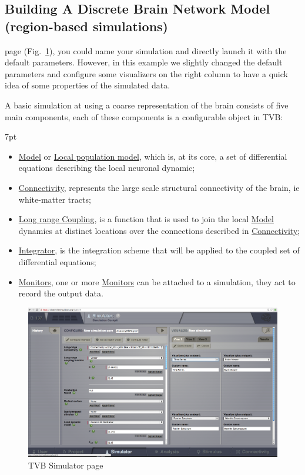 \documentclass{tufte-handout}
\newenvironment{blah}{%
  \def\FrameCommand{%
    \hspace{1pt}%
    {\color{DarkOrange}\vrule width 2pt}%
    {\color{PeachPuff}\vrule width 4pt}%
    \colorbox{PeachPuff}%
  }%
  \MakeFramed{\advance\hsize-\width\FrameRestore}%
  \noindent\hspace{-4.55pt}%
  \begin{adjustwidth}{}{7pt}%
  \vspace{2pt}\vspace{2pt}%
}
{%
  \vspace{2pt}\end{adjustwidth}\endMakeFramed%
}
\begin{document}
\subsection{Building A Discrete Brain Network Model (region-based simulations)}\label{sec:region_simulations}

 page (Fig.~\ref{fig:fig}), you could name your
simulation and directly launch it with the default parameters. However, in
this example we slightly changed the default parameters and configure some
visualizers on the right column to have a quick idea of some properties of the
simulated data.

A basic simulation at using a coarse representation of the brain consists of
five main components, each of these components is a configurable object in
TVB:

\begin{blah}
\begin{itemize}
\item \underline{Model} or \underline{Local population model}, which is, at its core, a set of differential equations describing the local neuronal dynamic;
\item \underline{Connectivity}, represents the large scale structural connectivity of the brain, ie white-matter tracts;
\item \underline{Long range Coupling}, is a function that is used to join the local \underline{Model} dynamics at distinct locations over the connections described in \underline{Connectivity};
\item \underline{Integrator}, is the integration scheme that will be applied to the coupled set of differential equations;
\item \underline{Monitors}, one or more \underline{Monitors} can be attached to a simulation, they act to record the output data.
\end{itemize}
\end{blah}

\begin{figure}[h]
  \includegraphics[width=\linewidth]{Handout_UI_BuildingYourOwnBrainNetworkModel_SimulatorArea}%
  \caption{TVB Simulator page}%
  \label{fig:fig}%
\end{figure}
\end{document}
